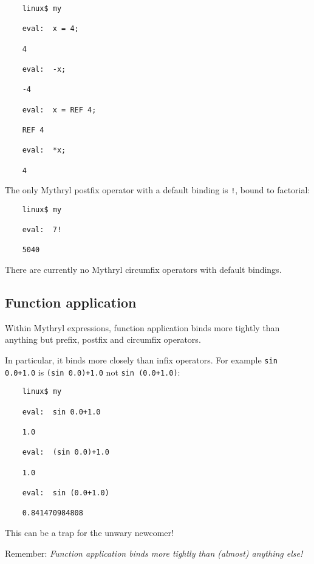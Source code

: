 \begin{verbatim}
    linux$ my

    eval:  x = 4;

    4

    eval:  -x;

    -4

    eval:  x = REF 4;

    REF 4

    eval:  *x;

    4
\end{verbatim}

The only Mythryl postfix operator with a default binding is {\tt !}, 
bound to factorial:

\begin{verbatim}
    linux$ my

    eval:  7!

    5040
\end{verbatim}

There are currently no Mythryl circumfix operators with default bindings.

\cutend*

\subsection{Function application}
\label{section:ref:expressions:function-application}

Within Mythryl expressions, function application binds more tightly 
than anything but prefix, postfix and circumfix operators.

In particular, it binds more closely than infix operators.  For 
example {\tt sin 0.0+1.0} is {\tt (sin 0.0)+1.0} not {\tt sin (0.0+1.0)}:

\begin{verbatim}
    linux$ my

    eval:  sin 0.0+1.0

    1.0

    eval:  (sin 0.0)+1.0

    1.0

    eval:  sin (0.0+1.0)

    0.841470984808

\end{verbatim}

This can be a trap for the unwary newcomer!

Remember: {\it Function application binds more tightly than (almost) anything else!}

